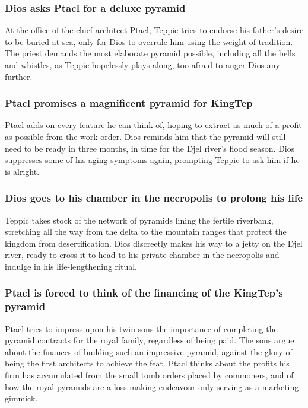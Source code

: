 \subsubsection{\Gls{Dios} asks \Gls{Ptacl} for a deluxe pyramid}
At the office of the chief architect \Gls{Ptacl}, \Gls{Teppic} tries to endorse his father's desire
to be buried at sea, only for \Gls{Dios} to overrule him using the weight of tradition. The priest
demands the most elaborate pyramid possible, including all the bells and whistles, as \Gls{Teppic}
hopelessly plays along, too afraid to anger \Gls{Dios} any further.

\subsubsection{\Gls{Ptacl} promises a magnificent pyramid for \Gls{KingTep}}
\Gls{Ptacl} adds on every feature he can think of, hoping to extract as much of a profit as possible
from the work order. \Gls{Dios} reminds him that the pyramid will still need to be ready in three
months, in time for the Djel river's flood season. \Gls{Dios} suppresses some of his aging symptoms
again, prompting \Gls{Teppic} to ask him if he is alright.

\subsubsection{\Gls{Dios} goes to his chamber in the necropolis to prolong his life}
\Gls{Teppic} takes stock of the network of pyramids lining the fertile riverbank, stretching all
the way from the delta to the mountain ranges that protect the kingdom from desertification.
\Gls{Dios} discreetly makes his way to a jetty on the Djel river, ready to cross it to head to his
private chamber in the necropolis and indulge in his life-lengthening ritual.

\subsubsection{\Gls{Ptacl} is forced to think of the financing of the \Gls{KingTep}'s pyramid}
\Gls{Ptacl} tries to impress upon his twin sons the importance of completing the pyramid contracts
for the royal family, regardless of being paid. The sons argue about the finances of building such
an impressive pyramid, against the glory of being the first architects to achieve the feat.
\Gls{Ptacl} thinks about the profits his firm has accumulated from the small tomb orders placed
by commoners, and of how the royal pyramids are a loss-making endeavour only serving as a marketing
gimmick.

